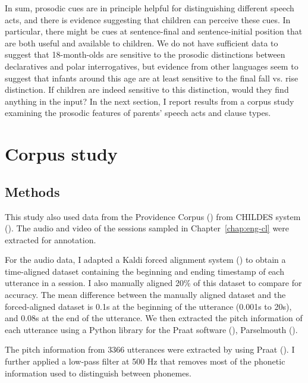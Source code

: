 In sum, prosodic cues are in principle helpful for distinguishing different speech acts, and there is evidence suggesting that children can perceive these cues. In particular, there might be cues at sentence-final and sentence-initial position that are both useful and available to children. We do not have sufficient data to suggest that 18-month-olds are sensitive to the prosodic distinctions between declaratives and polar interrogatives, but evidence from other languages seem to suggest that infants around this age are at least sensitive to the final fall vs. rise distinction. If children are indeed sensitive to this distinction, would they find anything in the input? In the next section, I report results from a corpus study examining the prosodic features of parents' speech acts and clause types.

\section{Corpus study}
\label{sec:prosody:corpus}


\subsection{Methods}
\label{sec:engsp:corpus:method}
This study also used data from the Providence Corpus (\citealt{ProvidenceCorpus}) from CHILDES system (\citealt{CHILDES}). The audio and video of the sessions sampled in Chapter~\ref{chap:eng-cl} were extracted for annotation. 

For the audio data, I adapted a Kaldi forced alignment system (\cite{kaldi}) to obtain a time-aligned dataset containing the beginning and ending timestamp of each utterance in a session. I also manually aligned 20\% of this dataset to compare for accuracy. The mean difference between the manually aligned dataset and the forced-aligned dataset is 0.1s at the beginning of the utterance (0.001s to 20s), and 0.08s at the end of the utterance. We then extracted the pitch information of each utterance using a Python library for the Praat software (\cite{praat}), Parselmouth (\cite{parselmouth}). 


The pitch information from 3366 utterances were extracted by using Praat (\citealt{praat}). I further applied a low-pass filter at 500 Hz that removes most of the phonetic information used to distinguish between phonemes. 

